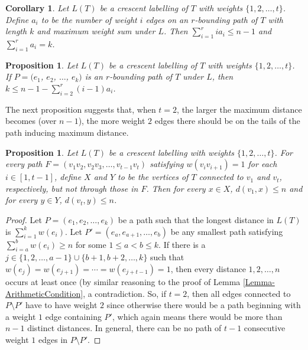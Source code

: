 \documentclass[12]{article}
\newtheorem{prop}[thm]{Proposition}
\newtheorem{cor}[thm]{Corollary}
\theoremstyle{definition}
\begin{document}
\begin{cor}
	Let $L(T)$ be a crescent labelling of $T$ with weights $\{1,2,\ldots,t\}$.  Define $a_i$ to be the number of weight $i$ edges on an $r$-bounding path of $T$ with length $k$ and maximum weight sum under $L$.  Then $\sum_{i=1}^r ia_i \leq n-1$ and $\sum_{i=1}^r a_i = k$.
\end{cor}

\begin{prop}
	Let $L(T)$ be a crescent labelling of $T$ with weights $\{1,2,\ldots,t\}$.  If $P = (e_1$, $e_2$, $\ldots$, $e_k)$ is an $r$-bounding path of $T$ under $L$, then $k \leq n-1 - \sum_{i=2}^r (i-1)a_i$.
\end{prop}

The next proposition suggests that, when $t =2$, the larger the maximum distance becomes (over $n-1$), the more weight $2$ edges there should be on the tails of the path inducing maximum distance.

\begin{prop}
	Let $L(T)$ be a crescent labelling with weights $\{1,2,\ldots, t\}$.  For every path $ F= (v_1v_2,v_2v_3,\ldots,v_{t-1}v_t)$ satisfying $w(v_iv_{i+1}) =1$ for each $i \in [1,t-1]$, define $X$ and $Y$ to be the vertices of $T$ connected to $v_1$ and $v_t$, respectively, but not through those in $F$.  Then for every $x \in X$, $d(v_1,x) \leq n$ and for every $y \in Y$, $d(v_t,y) \leq n$.
\end{prop}

\begin{proof}
	Let $P = (e_1,e_2,\ldots,e_k)$ be a path such that the longest distance in $L(T)$ is $\sum_{i=1}^k w(e_i)$.  Let $P' =  (e_a,e_{a+1}, \ldots, e_{b})$ be any smallest path satisfying $\sum_{i = a}^b w(e_i) \geq n$ for some $1 \leq a < b \leq k$.  If there is a $j \in \{1,2,\ldots, a-1\} \cup \{b+1,b+2,\ldots,k\}$ such that $w(e_j) = w(e_{j+1}) = \cdots = w(e_{j+t-1}) =1$, then every distance $1,2,\ldots,n$ occurs at least once (by similar reasoning to the proof of Lemma \ref{Lemma-ArithmeticCondition}, a contradiction.  So, if $t = 2$, then all edges connected to $P \setminus P'$ have to have weight $2$ since otherwise there would be a path beginning with a weight $1$ edge containing $P'$, which again means there would be more than $n-1$ distinct distances.  In general, there can be no path of $t-1$ consecutive weight $1$ edges in $P \setminus P'$. \qedhere
\end{proof}
\end{document}
